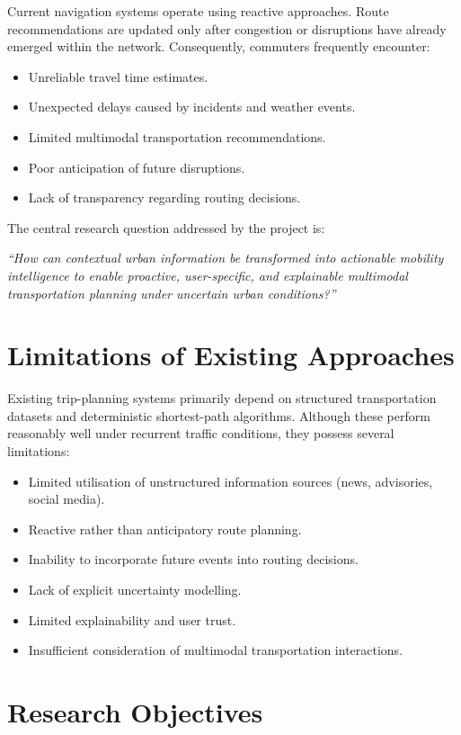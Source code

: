 \documentclass[12pt, a4paper]{report}
\begin{document}
Current navigation systems operate using reactive approaches. Route recommendations are updated only after congestion or disruptions have already emerged within the network. Consequently, commuters frequently encounter:

\begin{itemize}
    \item Unreliable travel time estimates.
    \item Unexpected delays caused by incidents and weather events.
    \item Limited multimodal transportation recommendations.
    \item Poor anticipation of future disruptions.
    \item Lack of transparency regarding routing decisions.
\end{itemize}

The central research question addressed by the project is:

\textit{``How can contextual urban information be transformed into actionable mobility intelligence to enable proactive, user-specific, and explainable multimodal transportation planning under uncertain urban conditions?''}

\section{Limitations of Existing Approaches}

Existing trip-planning systems primarily depend on structured transportation datasets and deterministic shortest-path algorithms. Although these perform reasonably well under recurrent traffic conditions, they possess several limitations:

\begin{itemize}
    \item Limited utilisation of unstructured information sources (news, advisories, social media).
    \item Reactive rather than anticipatory route planning.
    \item Inability to incorporate future events into routing decisions.
    \item Lack of explicit uncertainty modelling.
    \item Limited explainability and user trust.
    \item Insufficient consideration of multimodal transportation interactions.
\end{itemize}

\section{Research Objectives}
\end{document}
